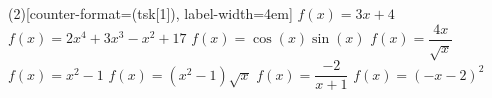 \documentclass{article}
\begin{document}
	\begin{tasks}(2)[counter-format=(tsk[1]), label-width=4em]
		\task $f(x)=3x+4$
		\task $f(x)=2x^4+3x^3-x^2+17$
		\task $f(x)=\cos(x)\sin(x)$
		\task $f(x)=\dfrac{4x}{\sqrt{x}}$
		\task $f(x)=x^2-1$
		\task $f(x)=(x^2-1)\sqrt{x}$
		\task $f(x)=\dfrac{-2}{x+1}$
		\task $f(x)=(-x-2)^2$
	\end{tasks}	
\end{document}
